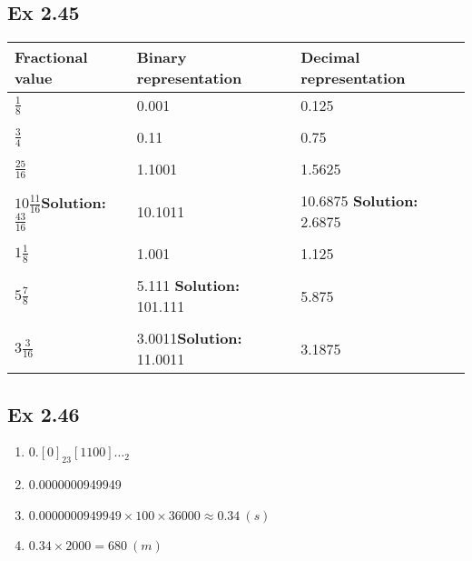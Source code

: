 \subsection{Ex 2.45}
\begin{table}[h]
    \centering
    \begin{tabular}{lll}
        \toprule
        Fractional value & Binary representation & Decimal representation\\
        \midrule
        $\frac{1}{8}$ & 0.001 & 0.125\\
                      &&\\
        $\frac{3}{4}$ & 0.11 & 0.75\\
                      &&\\
        $\frac{25}{16}$ & 1.1001 & 1.5625\\
                      &&\\
        $10\frac{11}{16}${\color{red}\textbf{Solution: }$\frac{43}{16}$} & 10.1011 & 10.6875 {\color{red}\textbf{Solution: }2.6875}\\
                      &&\\
        $1\frac{1}{8}$ & 1.001 & 1.125\\
                      &&\\
        $5\frac{7}{8}$ & 5.111 {\color{red}\textbf{Solution: }101.111}& 5.875\\
                      &&\\
        $3\frac{3}{16}$ & 3.0011{\color{red}\textbf{Solution: }11.0011} & 3.1875\\
        \bottomrule
    \end{tabular}
\end{table}

\subsection{Ex 2.46}
\begin{enumerate}
    \item $0.[0]_{23}[1100]\dots_2$
    \item 0.0000000949949
    \item $0.0000000949949 \times 100 \times 36000 \approx 0.34\ (s)$
    \item $0.34 \times 2000 = 680\ (m)$
\end{enumerate}

